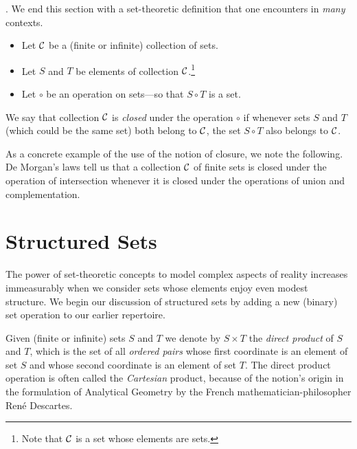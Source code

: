 \bigskip

.
%
We end this section with a set-theoretic definition that one encounters in {\em many} contexts.
\begin{itemize}
\item
Let $\cal C$ be a (finite or infinite) collection of sets.
\item
Let $S$ and $T$ be elements of collection $\cal C$.\footnote{Note that $\cal C$ is a set whose elements are sets.}
\item
Let $\circ$ be an operation on sets---so that $S \circ T$ is a set.
\end{itemize}
We say that collection $\cal C$ is {\em closed} under the operation $\circ$ if whenever sets $S$ and $T$ (which could be the same set) both belong to $\cal C$, the set $S \circ T$ also belongs to $\cal C$.

\medskip

As a concrete example of the use of the notion of closure, we note the following.  De Morgan's laws tell us that a collection $\cal C$ of finite sets is closed under the operation of intersection whenever it is closed under the operations of union and complementation.

\section{Structured Sets}
\label{sec:structured-set}

The power of set-theoretic concepts to model complex aspects of reality increases immeasurably when we consider sets whose elements enjoy even modest structure.  We begin our discussion of structured sets by adding a new (binary) set operation to our earlier repertoire.

  

\smallskip

Given (finite or infinite) sets $S$ and $T$ we denote by $S \times T$ the {\it direct product} of $S$ and $T$, which is the set of all {\it ordered pairs} whose first coordinate is an element of set $S$ and whose second coordinate is an element of set $T$.  The direct product operation is often called the {\it Cartesian} product, because of the notion's origin in the formulation of Analytical Geometry by the French mathematician-philosopher Ren\'{e} Descartes. 

